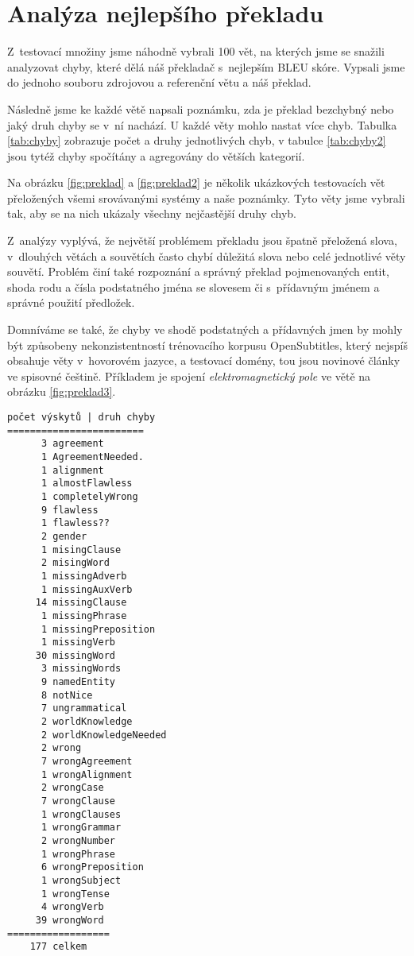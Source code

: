 \documentclass[a4]{article}
\begin{document}
\section{Analýza nejlepšího překladu}

Z~testovací množiny jsme náhodně vybrali 100 vět, na kterých jsme se
snažili analyzovat chyby, které dělá náš překladač s~nejlepším BLEU skóre.
Vypsali jsme do jednoho souboru zdrojovou a referenční větu a náš překlad.

Následně jsme ke každé větě napsali poznámku, zda je překlad bezchybný nebo
jaký druh chyby se v~ní nachází. U každé věty mohlo nastat více chyb. Tabulka
\ref{tab:chyby} zobrazuje počet a druhy jednotlivých chyb, v tabulce
\ref{tab:chyby2} jsou tytéž chyby spočítány a agregovány do větších kategorií.

Na obrázku \ref{fig:preklad} a \ref{fig:preklad2} je několik ukázkových
testovacích vět přeložených všemi srovávanými systémy a naše poznámky. Tyto věty
jsme vybrali tak, aby se na nich ukázaly všechny nejčastější druhy
chyb.

Z~analýzy vyplývá, že největší problémem překladu jsou špatně přeložená slova,
v~dlouhých větách a souvětích často chybí důležitá slova nebo celé jednotlivé věty
souvětí. Problém činí také rozpoznání a správný překlad pojmenovaných entit,
shoda rodu a čísla podstatného jména se slovesem či s~přídavným jménem
a správné použití předložek.

Domníváme se také, že chyby ve shodě podstatných a přídavných jmen by mohly být
způsobeny nekonzistentností trénovacího korpusu OpenSubtitles, který nejspíš
obsahuje věty v~hovorovém jazyce, a testovací domény, tou jsou novinové články
ve spisovné češtině. Příkladem je spojení \textit{elektromagnetický pole} ve
větě na obrázku \ref{fig:preklad3}.


\begin{table}[htpb]
\begin{verbatim}
počet výskytů | druh chyby
========================
      3 agreement
      1 AgreementNeeded.
      1 alignment
      1 almostFlawless
      1 completelyWrong
      9 flawless
      1 flawless??
      2 gender
      1 misingClause
      2 misingWord
      1 missingAdverb
      1 missingAuxVerb
     14 missingClause
      1 missingPhrase
      1 missingPreposition
      1 missingVerb
     30 missingWord
      3 missingWords
      9 namedEntity
      8 notNice
      7 ungrammatical
      2 worldKnowledge
      2 worldKnowledgeNeeded
      2 wrong
      7 wrongAgreement
      1 wrongAlignment
      2 wrongCase
      7 wrongClause
      1 wrongClauses
      1 wrongGrammar
      2 wrongNumber
      1 wrongPhrase
      6 wrongPreposition
      1 wrongSubject
      1 wrongTense
      4 wrongVerb
     39 wrongWord
==================
    177 celkem
\end{verbatim}
\caption{Analýza nejlepšího překladu: počet a druhy chyb ve 100 náhodně
vybraných testovacích větách.}
\label{tab:chyby}
\end{table}
\end{document}
